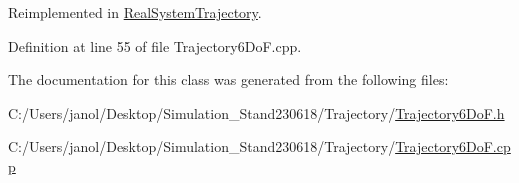 Reimplemented in \hyperlink{class_real_system_trajectory_a16cace4a95283499ffe59dccabff4c68}{Real\+System\+Trajectory}.



Definition at line 55 of file Trajectory6\+Do\+F.\+cpp.



The documentation for this class was generated from the following files\+:\begin{DoxyCompactItemize}
\item 
C\+:/\+Users/janol/\+Desktop/\+Simulation\+\_\+\+Stand230618/\+Trajectory/\hyperlink{_trajectory6_do_f_8h}{Trajectory6\+Do\+F.\+h}\item 
C\+:/\+Users/janol/\+Desktop/\+Simulation\+\_\+\+Stand230618/\+Trajectory/\hyperlink{_trajectory6_do_f_8cpp}{Trajectory6\+Do\+F.\+cpp}\end{DoxyCompactItemize}
